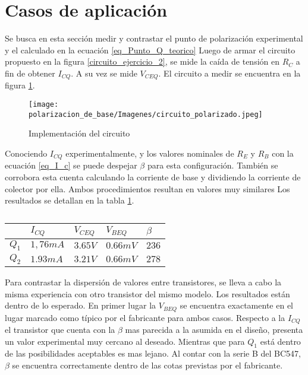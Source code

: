 \section{Casos de aplicación}

Se busca en esta sección medir y contrastar el punto de polarización experimental y el calculado en la ecuación \ref{eq_Punto_Q_teorico}
Luego de armar el circuito propuesto en la figura \ref{circuito_ejercicio_2}, se mide la caída de tensión en $R_C$ a fin de obtener $I_{CQ}$. A su vez se mide $V_{CEQ}$. El circuito a medir se encuentra en la figura \ref{fig_circuito_fisico}.
\begin{figure}[ht]
    \centering
    \texttt{[image: polarizacion\_de\_base/Imagenes/circuito\_polarizado.jpeg]}
    \caption{Implementación del circuito}\label{fig_circuito_fisico}
\end{figure} 


Conociendo $I_{CQ}$ experimentalmente, y los valores nominales de $R_E$ y $R_B$ con la ecuación \ref{eq_I_c} se puede despejar $\beta$ para esta configuración. También se corrobora esta cuenta calculando la corriente de base y dividiendo la corriente de colector por ella.
Ambos procedimientos resultan en valores muy similares
Los resultados se detallan en la tabla \ref{tabla_resultados_polarizacion}.

\begin{table}[ht]
    \centering
    \begin{tabular}{|l|l|l|l|l|}
    \hline
          & $I_{CQ}$  & $V_{CEQ}$ & $V_{BEQ}$ & $\beta$ \\ \hline
    $Q_1$ & $1,76 mA$ & $3.65 V$ & $0.66 mV$  & $236$   \\ \hline
    $Q_2$ & $1.93 mA$ & $3.21 V$  & $0.66 mV$ & $278$   \\ \hline
    \end{tabular}
    \caption{}\label{tabla_resultados_polarizacion}
\end{table}
Para contrastar la dispersión de valores entre transistores, se lleva a cabo la misma experiencia con otro transistor del mismo modelo.
Los resultados están dentro de lo esperado. En primer lugar la $V_{BEQ}$ se encuentra exactamente en el lugar marcado como típico por el fabricante para ambos casos.
Respecto a la $I_{CQ}$ el transistor que cuenta con la $\beta$ mas parecida a la asumida en el diseño, presenta un valor experimental muy cercano al deseado. Mientras que para $Q_1$ está dentro de las posibilidades aceptables es mas lejano. 
Al contar con la serie B del BC547, $\beta$ se encuentra correctamente dentro de las cotas previstas por el fabricante.

